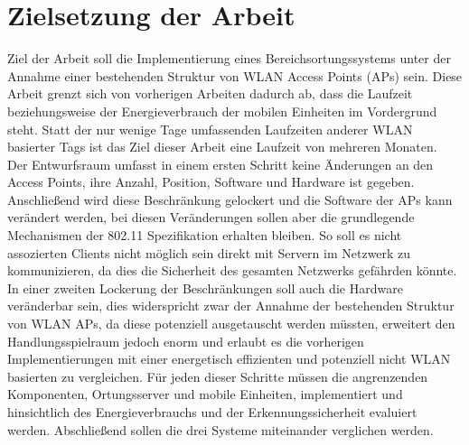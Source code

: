 \section{Zielsetzung der Arbeit}
\label{ch:Einleitung:sec:Zielsetzung}
Ziel der Arbeit soll die Implementierung eines Bereichsortungssystems unter der Annahme einer bestehenden Struktur von WLAN Access Points (APs) sein. 
Diese Arbeit grenzt sich von vorherigen Arbeiten dadurch ab, dass die Laufzeit beziehungsweise der Energieverbrauch der mobilen Einheiten im Vordergrund steht. 
Statt der nur wenige Tage umfassenden Laufzeiten anderer WLAN basierter Tags ist das Ziel dieser Arbeit eine Laufzeit von mehreren Monaten. \\
Der Entwurfsraum umfasst in einem ersten Schritt keine Änderungen an den Access Points, ihre Anzahl, Position, Software und Hardware ist gegeben. 
Anschließend wird diese Beschränkung gelockert und die Software der APs kann verändert werden, bei diesen Veränderungen sollen aber die grundlegende Mechanismen der 802.11 Spezifikation erhalten bleiben. 
So soll es nicht assozierten Clients nicht möglich sein direkt mit Servern im Netzwerk zu kommunizieren, da dies die Sicherheit des gesamten Netzwerks gefährden könnte.
In einer zweiten Lockerung der Beschränkungen soll auch die Hardware veränderbar sein, dies widerspricht zwar der Annahme der bestehenden Struktur von WLAN APs, da diese potenziell ausgetauscht werden müssten, erweitert den Handlungsspielraum jedoch enorm und erlaubt es die vorherigen Implementierungen mit einer energetisch effizienten und potenziell nicht WLAN basierten zu vergleichen. 
Für jeden dieser Schritte müssen die angrenzenden Komponenten, Ortungsserver und mobile Einheiten, implementiert und hinsichtlich des Energieverbrauchs und der Erkennungssicherheit evaluiert werden. Abschließend sollen die drei Systeme miteinander verglichen werden. \\


